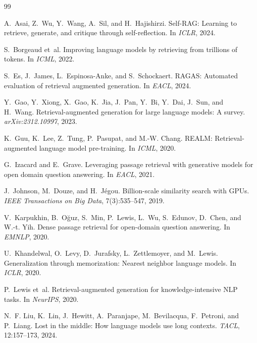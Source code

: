 \documentclass[11pt,a4paper]{article}
\begin{document}
\begin{thebibliography}{99}

A.~Asai, Z.~Wu, Y.~Wang, A.~Sil, and H.~Hajishirzi.
\newblock Self-RAG: Learning to retrieve, generate, and critique through
  self-reflection.
\newblock In \emph{ICLR}, 2024.

S.~Borgeaud et~al.
\newblock Improving language models by retrieving from trillions of tokens.
\newblock In \emph{ICML}, 2022.

S.~Es, J.~James, L.~Espinosa-Anke, and S.~Schockaert.
\newblock RAGAS: Automated evaluation of retrieval augmented generation.
\newblock In \emph{EACL}, 2024.

Y.~Gao, Y.~Xiong, X.~Gao, K.~Jia, J.~Pan, Y.~Bi, Y.~Dai, J.~Sun, and H.~Wang.
\newblock Retrieval-augmented generation for large language models: A survey.
\newblock \emph{arXiv:2312.10997}, 2023.

K.~Guu, K.~Lee, Z.~Tung, P.~Pasupat, and M.-W. Chang.
\newblock REALM: Retrieval-augmented language model pre-training.
\newblock In \emph{ICML}, 2020.

G.~Izacard and E.~Grave.
\newblock Leveraging passage retrieval with generative models for open domain
  question answering.
\newblock In \emph{EACL}, 2021.

J.~Johnson, M.~Douze, and H.~Jégou.
\newblock Billion-scale similarity search with GPUs.
\newblock \emph{IEEE Transactions on Big Data}, 7(3):535--547, 2019.

V.~Karpukhin, B.~Oğuz, S.~Min, P.~Lewis, L.~Wu, S.~Edunov, D.~Chen, and
  W.-t. Yih.
\newblock Dense passage retrieval for open-domain question answering.
\newblock In \emph{EMNLP}, 2020.

U.~Khandelwal, O.~Levy, D.~Jurafsky, L.~Zettlemoyer, and M.~Lewis.
\newblock Generalization through memorization: Nearest neighbor language
  models.
\newblock In \emph{ICLR}, 2020.

P.~Lewis et~al.
\newblock Retrieval-augmented generation for knowledge-intensive NLP tasks.
\newblock In \emph{NeurIPS}, 2020.

N.~F. Liu, K.~Lin, J.~Hewitt, A.~Paranjape, M.~Bevilacqua, F.~Petroni, and
  P.~Liang.
\newblock Lost in the middle: How language models use long contexts.
\newblock \emph{TACL}, 12:157--173, 2024.


\end{thebibliography}
\end{document}
